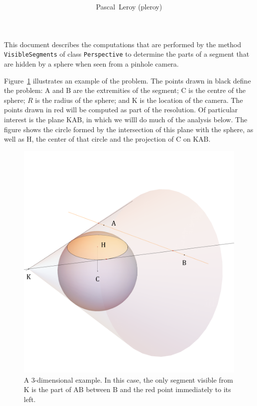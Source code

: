 \documentclass[10pt, a4paper, twoside]{basestyle}
\title{%
\textdisplay{%
Hiding Computations in Projection%
}%
}
\author{Pascal~Leroy (pleroy)}
\newcommand{\point}[1]{\mathrm{#1}}
\newcommand{\straightline}[2]{\point #1 \point #2}
\newcommand{\plane}[3]{\point #1 \point #2 \point #3}
\begin{document}
\maketitle
This document describes the computations that are performed by the method
\texttt{VisibleSegments} of class \texttt{Perspective} to determine the parts of
a segment that are hidden by a sphere when seen from a pinhole camera.

Figure~\ref{fig3d} illustrates an example of the problem.  The points drawn in
black define the problem: $\point A$ and $\point B$ are the extremities of the
segment; $\point C$ is the centre of the sphere; $R$ is the radius of the
sphere; and $\point K$ is the location of the camera.  The points drawn in red
will be computed as part of the resolution.  Of particular interest is the plane
$\plane KAB$, in which we willl do much of the analysis below.  The figure shows
the circle formed by the intersection of this plane with the sphere, as well as
$\point H$, the center of that circle and the projection of $\point C$ on
$\plane KAB$.
\begin{figure}[htb!]
\centering
\includegraphics[scale=0.35]{Perspective-hiding-3d}
\caption{A 3-dimensional example.  In this case, the only segment visible from
$\point K$ is the part of $\straightline AB$ between $\point B$ and the red
point immediately to its left.\label{fig3d}}
\end{figure}
\end{document}
